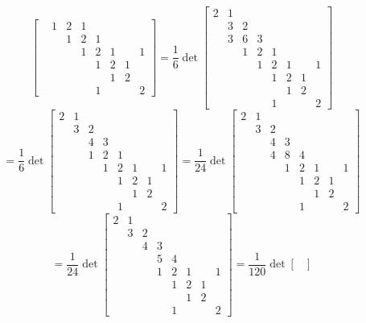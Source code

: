 \begin{itemize}
$$\begin{bmatrix}
& 1 & 2 & 1 \\
& & 1 & 2 & 1 \\
& & & 1 & 2 & 1 & & 1\\
& & & & 1 & 2 & 1 \\
& & & & & 1 & 2 \\
& & & & 1 & & & 2
\end{bmatrix} = \frac{1}{6}\det\begin{bmatrix}
2 & 1 \\
& 3 & 2 \\
& 3 & 6 & 3 \\
& & 1 & 2 & 1 \\
& & & 1 & 2 & 1 & & 1\\
& & & & 1 & 2 & 1 \\
& & & & & 1 & 2 \\
& & & & 1 & & & 2
\end{bmatrix}$$
$$= \frac{1}{6}\det\begin{bmatrix}
2 & 1 \\
& 3 & 2 \\
& & 4 & 3 \\
& & 1 & 2 & 1 \\
& & & 1 & 2 & 1 & & 1\\
& & & & 1 & 2 & 1 \\
& & & & & 1 & 2 \\
& & & & 1 & & & 2
\end{bmatrix} = \frac{1}{24}\det\begin{bmatrix}
2 & 1 \\
& 3 & 2 \\
& & 4 & 3 \\
& & 4 & 8 & 4 \\
& & & 1 & 2 & 1 & & 1\\
& & & & 1 & 2 & 1 \\
& & & & & 1 & 2 \\
& & & & 1 & & & 2
\end{bmatrix}$$
$$= \frac{1}{24}\det\begin{bmatrix}
2 & 1 \\
& 3 & 2 \\
& & 4 & 3 \\
& & & 5 & 4 \\
& & & 1 & 2 & 1 & & 1\\
& & & & 1 & 2 & 1 \\
& & & & & 1 & 2 \\
& & & & 1 & & & 2
\end{bmatrix} = \frac{1}{120}\det\begin{bmatrix}

\end{bmatrix}$$
\end{itemize}

